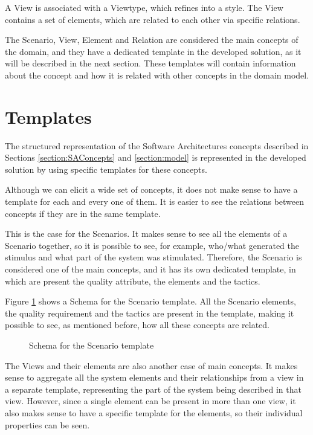A View is associated with a Viewtype, which refines into a style. The View contains a set of elements, which are related to each other via specific relations.

The Scenario, View, Element and Relation are considered the main concepts of the domain, and they have a dedicated template in the developed solution, as it will be described in the next section. These templates will contain information about the concept and how it is related with other concepts in the domain model.

\section{Templates}
\label{section:templates}
The structured representation of the Software Architectures concepts described in Sections \ref{section:SAConcepts} and \ref{section:model} is represented in the developed solution by using specific templates for these concepts.

Although we can elicit a wide set of concepts, it does not make sense to have a template for each and every one of them. It is easier to see the relations between concepts if they are in the same template. 

This is the case for the Scenarios. It makes sense to see all the elements of a Scenario together, so it is possible to see, for example, who/what generated the stimulus and what part of the system was stimulated. Therefore, the Scenario is considered one of the main concepts, and it has its own dedicated template, in which are present the quality attribute, the elements and the tactics. 

Figure \ref{figure:scenarioTemplate} shows a Schema for the Scenario template. All the Scenario elements, the quality requirement and the tactics are present in the template, making it possible to see, as mentioned before, how all these concepts are related.

\begin{figure}[h]
\centering

\caption{Schema for the Scenario template}
\label{figure:scenarioTemplate}
\end{figure}

The Views and their elements are also another case of main concepts. It makes sense to aggregate all the system elements and their relationships from a view in a separate template, representing the part of the system being described in that view. However, since a single element can be present in more than one view, it also makes sense to have a specific template for the elements, so their individual properties can be seen.

